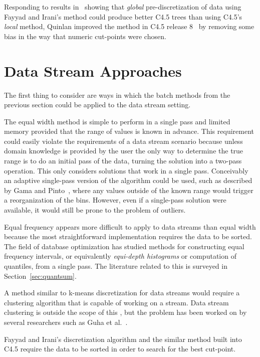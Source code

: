 Responding to results in~\cite{discretize} showing that {\em global} pre-discretization of data using Fayyad and Irani's method could produce better C4.5 trees than using C4.5's {\em local} method, Quinlan improved the method in C4.5 release 8~\cite{c4.5rel8} by removing some bias in the way that numeric cut-points were chosen.

\section{Data Stream Approaches}
\label{sec:dsnumeric}

The first thing to consider are ways in which the batch methods from the previous section could be applied to the data stream setting.

The equal width method is simple to perform in a single pass and limited memory provided that the range of values is known in advance. This requirement could easily violate the requirements of a data stream scenario because unless domain knowledge is provided by the user the only way to determine the true range is to do an initial pass of the data, turning the solution into a two-pass operation. This \thesis only considers solutions that work in a single pass. Conceivably an adaptive single-pass version of the algorithm could be used, such as described by Gama and Pinto~\cite{discretizeds}, where any values outside of the known range would trigger a reorganization of the bins. However, even if a single-pass solution were available, it would still be prone to the problem of outliers.

Equal frequency appears more difficult to apply to data streams than equal width because the most straightforward implementation requires the data to be sorted. The field of database optimization has studied methods for constructing equal frequency intervals, or equivalently {\em equi-depth histograms} or computation of quantiles, from a single pass. The literature related to this is surveyed in Section~\ref{sec:quantsum}.

A method similar to k-means discretization for data streams would require a clustering algorithm that is capable of working on a stream. Data stream clustering is outside the scope of this \thesisc, but the problem has been worked on by several researchers such as Guha et al.~\cite{dscluster1,dscluster2}.

Fayyad and Irani's discretization algorithm and the similar method built into C4.5 require the data to be sorted in order to search for the best cut-point.


